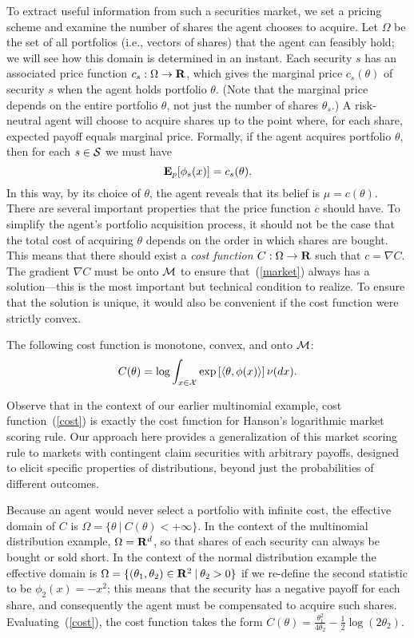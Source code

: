 To extract useful information from such a securities market, we set a pricing scheme and examine the number of shares the agent chooses to acquire. Let $\Omega$ be the set of all portfolios (i.e., vectors of shares) that the agent can feasibly hold; we will see how this domain is determined in an instant. Each security $s$ has an associated price function $c_s : \Omega \rightarrow \mathbf{R}$, which gives the marginal price $c_s(\theta)$ of security $s$ when the agent holds portfolio $\theta$. (Note that the marginal price depends on the entire portfolio $\theta$, not just the number of shares $\theta_s$.) A risk-neutral agent will choose to acquire shares up to the point where, for each share, expected payoff equals marginal price. Formally, if the agent acquires portfolio $\theta$, then for each $s \in \mathcal{S}$ we must have
%
\begin{equation} \label{market}
\mathbf{E}_p[\phi_s(x)] = c_s(\theta).
\end{equation}
%
In this way, by its choice of $\theta$, the agent reveals that its belief is $\mu = c(\theta)$. There are several important properties that the price function $c$ should have. To simplify the agent's portfolio acquisition process, it should not be the case that the total cost of acquiring $\theta$ depends on the order in which shares are bought. This means that there should exist a \emph{cost function} $C : \Omega \rightarrow \mathbf{R}$ such that $c = \nabla C$. The gradient $\nabla C$ must be onto $\mathcal{M}$ to ensure that~(\ref{market}) always has a solution---this is the most important but technical condition to realize. To ensure that the solution is unique, it would also be convenient if the cost function were strictly convex. 
%
\begin{proposition}
The following cost function is monotone, convex, and onto $\mathcal{M}$: 
%
\begin{equation} \label{cost}
C(\theta) = \log \int_{x \in \mathcal{X}} \exp \left[\langle \theta, \phi(x) \rangle\right] \nu(dx).
\end{equation}
%
\end{proposition}
%
\noindent
Observe that in the context of our earlier multinomial example, cost function~(\ref{cost}) is exactly the cost function for Hanson's logarithmic market scoring rule. Our approach here provides a generalization of this market scoring rule to markets with contingent claim securities with arbitrary payoffs, designed to elicit specific properties of distributions, beyond just the probabilities of different outcomes. 

Because an agent would never select a portfolio with infinite cost, the effective domain of $C$ is $\Omega = \{\theta \:|\: C(\theta) < +\infty \}$. In the context of the multinomial distribution example, $\Omega = \mathbf{R}^d$, so that shares of each security can always be bought or sold short. In the context of the normal distribution example the effective domain is $\Omega = \{(\theta_1,\theta_2) \in \mathbf{R}^2 \:|\: \theta_2 > 0 \}$ if we re-define the second statistic to be $\phi_2(x) = -x^2$; this means that the security has a negative payoff for each share, and consequently the agent must be compensated to acquire such shares. Evaluating~(\ref{cost}), the cost function takes the form $C(\theta) = \frac{\theta_1^2}{4\theta_2} - \frac{1}{2}\log(2\theta_2)$.

